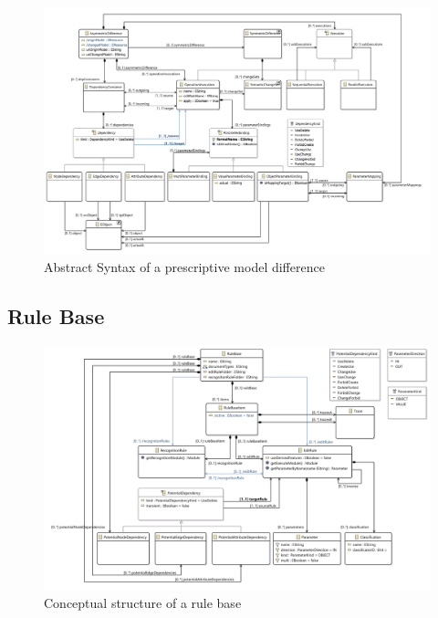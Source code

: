 \begin{figure}[h!]
\centering
\includegraphics[width=\textwidth]{images/architecture/asymmetric_model}
\caption{Abstract Syntax of a prescriptive model difference}
\end{figure}

\newpage


\subsection{Rule Base}

\begin{figure}[h!]
\centering
\includegraphics[width=\textwidth]{images/architecture/rulebase_model}
\caption{Conceptual structure of a rule base}
\end{figure}


